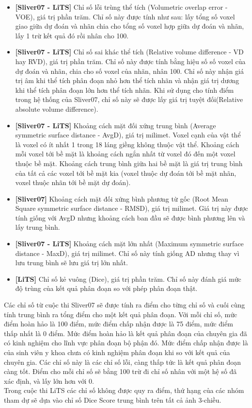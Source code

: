 \begin{itemize}
    \item \textbf{[Sliver07 - LiTS]} Chỉ số lỗi trùng thể tích (Volumetric overlap error - VOE), giá trị phần trăm. Chỉ số này được tính như sau: lấy tổng số voxel giao giữa dự đoán và nhãn chia cho tổng số voxel hợp giữa dự đoán và nhãn, lấy 1 trừ kết quả đó rồi nhân cho 100.
    \item \textbf{[Sliver07 - LiTS]} Chỉ số sai khác thể tích (Relative volume difference - VD hay RVD), giá trị phần trăm. Chỉ số này được tính bằng hiệu số số voxel của dự đoán và nhãn, chia cho  số voxel của nhãn, nhân 100. Chỉ số này nhận giá trị âm khi thể tích phân đoạn nhỏ hơn thể tích nhãn và nhận giá trị dương khi thể tích phân đoạn lớn hơn thể tích nhãn. Khi sử dụng cho tính điểm trong hệ thống của Sliver07, chỉ số này sẽ được lấy giá trị tuyệt đối(Relative absolute volume difference).
    \item \textbf{[Sliver07 - LiTS]} Khoảng cách mặt đối xứng trung bình (Average symmetric surface distance - AvgD), giá trị milimet. Voxel cạnh của vật thể là voxel có ít nhất 1 trong 18 láng giềng không thuộc vật thể. Khoảng cách mỗi voxel tới bề mặt là khoảng cách ngắn nhất từ voxel đó đến một voxel thuộc bề mặt. Khoảng cách trung bình giữa hai bề mặt là giá trị trung bình của tất cả các voxel tới bề mặt kia (voxel thuộc dự đoán tới bề mặt nhãn, voxel thuộc nhãn tới bề mặt dự đoán).
    \item \textbf{[Sliver07]} Khoảng cách mặt đối xứng bình phương từ gốc (Root Mean Square symmetric surface distance - RMSD), giá trị milimet. Giá trị này được tính giống với  AvgD nhưng khoảng cách ban đầu sẽ được bình phương lên và lấy trung bình.
    \item \textbf{[Sliver07 - LiTS]} Khoảng cách mặt lớn nhất (Maximum symmetric surface distance - MaxD), giá trị milimet. Chỉ số này tính giống AD nhưng thay vì lưu trung bình sẽ lưu giá trị lớn nhất.
    \item \textbf{[LiTS]} Chỉ số kẻ vuông (Dice), giá trị phần trăm. Chỉ số này đánh giá mức độ trùng của kết quả phân đoạn so với phép phân đoạn thật.
\end{itemize}
Các chỉ số từ cuộc thi Sliver07 sẽ được tính ra điểm cho từng chỉ số và cuối cùng tính trung bình ra tổng điểm cho một kết quả phân đoạn. Với mỗi chỉ số, mức điểm hoàn hảo là 100 điểm, mức điểm chấp nhận được là 75 điểm, mức điểm thấp nhất là 0 điểm. Mức điểm hoàn hảo là kết quả phân đoạn của chuyên gia đã có kinh nghiệm cho lĩnh vực phân đoạn bộ phận đó. Mức điểm chấp nhận được là của sinh viên y khoa chưa có kinh nghiệm phân đoạn khi so với kết quả của chuyên gia. Các chỉ số này là các chỉ số lỗi, càng thấp tức là kết quả phân đoạn càng tốt. Điểm cho mỗi chỉ số sẽ bằng 100 trừ đi chỉ số nhân với một hệ số đã xác định, và lấy lớn hơn với 0. \\
Trong cuộc thi LiTS các chỉ số không được quy ra điểm, thứ hạng của các nhóm tham dự sẽ dựa vào chỉ số Dice Score trung bình trên tất cả ảnh 3-chiều.

